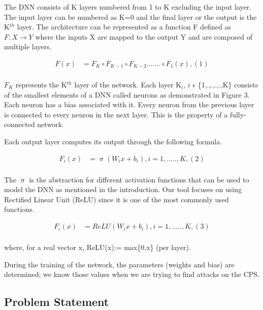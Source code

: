The DNN consists of K layers numbered from 1 to K excluding the input layer.  The input layer can be numbered as K=0 and the final layer or the output is the K$^{th}$ layer.
The architecture can be represented as a function F defined as $F: X \rightarrow Y$ where the inputs X are mapped to the output Y and are composed of multiple layers. 

\begin{align*}
F(x) &= F_K \circ F_{K-1} \circ F_{K-2} ....... \circ F_1(x),    (1) \\
\end{align*}

$F_K$ represents the K$^{th}$ layer of the network. Each layer K$_{i}$, 
$i$ $\epsilon$ \{1,.,.,.,.,K\} consists of the smallest elements of a DNN called neurons as demonstrated in Figure 3.  Each neuron has a bias associated with it. Every neuron from the previous layer is connected to every neuron in the next layer. This is the property of a fully-connected network. 

Each output layer computes its output through the following formula. 

\begin{align*}
F_i(x) &= \upsigma(W_ix + b_i) ,  i = 1,.....,K, (2)  \\
\end{align*}

The $\upsigma$ is the abstraction for different activation functions that can be used to model the DNN as mentioned in the introduction. Our tool focuses on using Rectified Linear Unit (ReLU) since it is one of the most commonly used functions. %

\begin{align*}
F_i(x) &= ReLU(W_ix + b_i) ,  i = 1,.....,K , (3) \\
\end{align*}

where, for a real vector x, ReLU(x):= max\{0,x\} (per layer).

During the training of the network, the parameters (weights and bias) are determined; we know those values when we are trying to find attacks on the CPS.

\subsection{Problem Statement}

